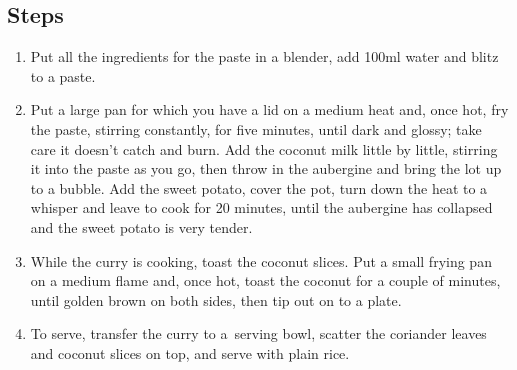 \documentclass{book}
\begin{document}
\subsection*{Steps}
\begin{enumerate}
\item Put all the ingredients for the paste in a blender, add 100ml water and blitz to a paste.
\item Put a large pan for which you have a lid on a medium heat and, once hot, fry the paste, stirring constantly, for five minutes, until dark and glossy; take care it doesn’t catch and burn. Add the coconut milk little by little, stirring it into the paste as you go, then throw in the aubergine and bring the lot up to a bubble. Add the sweet potato, cover the pot, turn down the heat to a whisper and leave to cook for 20 minutes, until the aubergine has collapsed and the sweet potato is very tender.
\item While the curry is cooking, toast the coconut slices. Put a small frying pan on a medium flame and, once hot, toast the coconut for a couple of minutes, until golden brown on both sides, then tip out on to a plate.
\item To serve, transfer the curry to a serving bowl, scatter the coriander leaves and coconut slices on top, and serve with plain rice.
\end{enumerate}
\newpage
\end{document}
